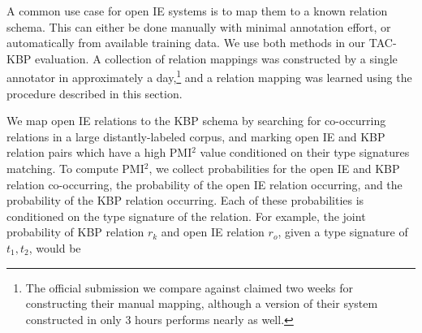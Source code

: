 A common use case for open IE systems is to map them to a
  known relation schema.
This can either be done manually with minimal annotation effort, or
  automatically from available training data.
We use both methods in our TAC-KBP evaluation.
A collection of relation mappings was constructed by a single
  annotator in approximately a day,\footnote{
    The official submission we compare against claimed two weeks for constructing
    their manual mapping, although a version of their system constructed in only
    3 hours performs nearly as well.
  } and a relation mapping was learned
  using the procedure described in this section.


We map open IE relations to the KBP schema by searching for co-occurring
  relations in a large distantly-labeled corpus, and marking open IE and
  KBP relation pairs which have a high PMI$^2$ value
  \cite{key:1994dailee-pmisquared,key:2005evert-pmi}
  conditioned on their
  type signatures matching.
To compute PMI$^2$, we collect probabilities for the open IE and KBP
  relation co-occurring, the probability of the open IE relation occurring,
  and the probability of the KBP relation occurring.
Each of these probabilities is conditioned on the type signature of the relation.
For example, the joint probability of KBP relation $r_k$ and open IE relation
  $r_o$, given a type signature of $t_1, t_2$, would be


